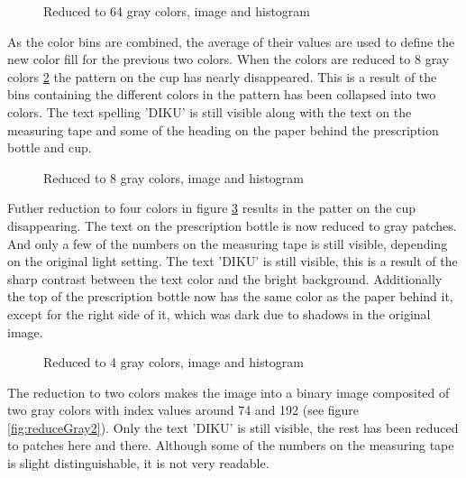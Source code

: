 \documentclass[a4paper, 10pt, final]{article}
\begin{document}
\begin{figure}[!h]
\centering
{}
\caption{Reduced to 64 gray colors, image and histogram}
\label{fig:reduceGray64}
\end{figure}

As the color bins are combined, the average of their values are used
to define the new color fill for the previous two colors. When the
colors are reduced to 8 gray colors \ref{fig:reduceGray8} the pattern on
the cup has nearly disappeared. This is a result of the bins
containing the different colors in the pattern has been collapsed into
two colors. The text spelling 'DIKU' is still visible along with the
text on the measuring tape and some of the heading on the paper behind
the prescription bottle and cup.

\begin{figure}[!h]
\centering
{}
\caption{Reduced to 8 gray colors, image and histogram}
\label{fig:reduceGray8}
\end{figure}

Futher reduction to four colors in figure \ref{fig:reduceGray4}
results in the patter on the cup disappearing. The text on the
prescription bottle is now reduced to gray patches. And only
a few of the numbers on the measuring tape is still visible, depending
on the original light setting. The text 'DIKU' is still visible, this
is a result of the sharp contrast between the text color and the
bright background. Additionally the top of the prescription bottle now
has the same color as the paper behind it, except for the right side
of it, which was dark due to shadows in the original image.

\begin{figure}[!h]
\centering
{}
\caption{Reduced to 4 gray colors, image and histogram}
\label{fig:reduceGray4}
\end{figure}

The reduction to two colors makes the image into a binary image
composited of two gray colors with index values around 74 and 192 (see
figure \ref{fig:reduceGray2}). Only the text 'DIKU' is still visible,
the rest has been reduced to patches here and there. Although some of
the numbers on the measuring tape is slight distinguishable, it is not
very readable.
\end{document}

